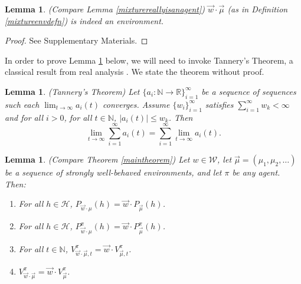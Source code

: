 \documentclass[twoside]{article}
\newtheorem{lemma}[theorem]{Lemma}
\begin{document}
\begin{lemma}
\label{wcdotSisenvlemma}
    (Compare Lemma \ref{mixturereallyisanagent})
    $\vec w\cdot\vec\mu$ (as in Definition \ref{mixtureenvdefn})
    is indeed an environment.
\end{lemma}

\begin{proof}
    See Supplementary Materials.
\end{proof}

In order to prove Lemma \ref{envmaintheorem} below, we will need to invoke
Tannery's Theorem, a classical result from real analysis \cite{bromwich2005introduction}.
We state the theorem
without proof.

\begin{lemma}
\label{tannerysthm}
    (Tannery's Theorem)
    Let $\{a_i:\mathbb N\to\mathbb R\}_{i=1}^\infty$ be a sequence of sequences
    such each $\lim_{t\to\infty}a_i(t)$ converges.
    Assume $\{w_i\}_{i=1}^\infty$ satisfies
    $\sum_{i=1}^\infty w_k<\infty$ and for all $i>0$,
    for all $t\in\mathbb N$,
    $|a_i(t)|\leq w_k$. Then
    \[
        \lim_{t\to\infty}\sum_{i=1}^\infty a_i(t)
        =
        \sum_{i=1}^\infty\lim_{t\to\infty} a_i(t).
    \]
\end{lemma}

\begin{lemma}
\label{envmaintheorem}
    (Compare Theorem \ref{maintheorem})
    Let $w\in\mathscr W$, let $\vec\mu=(\mu_1,\mu_2,\ldots)$ be
    a sequence of strongly well-behaved environments, and let $\pi$ be any agent. Then:
    \begin{enumerate}
        \item
        For all $h\in\mathcal H$,
        $P_{\vec w\cdot\mu}(h)=\vec w\cdot P_{\vec\mu}(h)$.
        \item
        For all $h\in\mathcal H$,
        $P^\pi_{\vec w\cdot\mu}(h)=\vec w\cdot P^\pi_{\vec\mu}(h)$.
        \item
        For all $t\in\mathbb N$,
        $V^\pi_{\vec w\cdot \vec\mu,t}=\vec w\cdot V^\pi_{\vec\mu,t}$.
        \item
        $V^\pi_{\vec w\cdot \vec\mu}=\vec w\cdot V^\pi_{\vec\mu}$.
    \end{enumerate}
\end{lemma}
\end{document}
